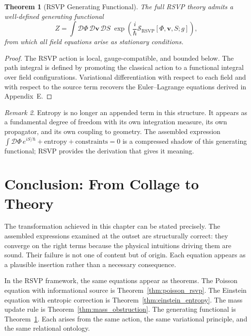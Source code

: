 \documentclass[12pt,a4paper,openany]{book}
\theoremstyle{plain}
\newtheorem{theorem}{Theorem}[chapter]
\theoremstyle{definition}
\theoremstyle{remark}
\newtheorem{remark}[theorem]{Remark}
\begin{document}
\begin{theorem}[RSVP Generating Functional]
\label{thm:path_integral_closure}
The full RSVP theory admits a well-defined generating functional
\[
Z = \int \mathcal{D}\Phi\,\mathcal{D}\mathbf{v}\,\mathcal{D}S\; \exp\!\left(\frac{i}{\hbar}\mathcal{S}_{\mathrm{RSVP}}[\Phi,\mathbf{v},S;g]\right),
\]
from which all field equations arise as stationary conditions.
\end{theorem}

\begin{proof}
The RSVP action is local, gauge-compatible, and bounded below. The path integral is defined by promoting the classical action to a functional integral over field configurations. Variational differentiation with respect to each field and with respect to the source term recovers the Euler--Lagrange equations derived in Appendix~E.
\end{proof}

\begin{remark}
Entropy is no longer an appended term in this structure. It appears as a fundamental degree of freedom with its own integration measure, its own propagator, and its own coupling to geometry. The assembled expression $\int\mathcal{D}\Phi\,e^{iS/\hbar} + \text{entropy} + \text{constraints} = 0$ is a compressed shadow of this generating functional; RSVP provides the derivation that gives it meaning.
\end{remark}

\section{Conclusion: From Collage to Theory}

The transformation achieved in this chapter can be stated precisely. The assembled expressions examined at the outset are structurally correct: they converge on the right terms because the physical intuitions driving them are sound. Their failure is not one of content but of origin. Each equation appears as a plausible insertion rather than a necessary consequence.

In the RSVP framework, the same equations appear as theorems. The Poisson equation with informational source is Theorem~\ref{thm:poisson_rsvp}. The Einstein equation with entropic correction is Theorem~\ref{thm:einstein_entropy}. The mass update rule is Theorem~\ref{thm:mass_obstruction}. The generating functional is Theorem~\ref{thm:path_integral_closure}. Each arises from the same action, the same variational principle, and the same relational ontology.
\end{document}

